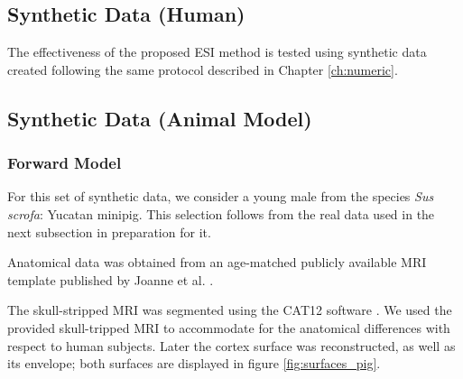 \subsection{Synthetic Data (Human)}

The effectiveness of the proposed ESI method is tested using synthetic data created following the same protocol described in Chapter \ref{ch:numeric}.

\subsection{Synthetic Data (Animal Model)}

%
%

\subsubsection{Forward Model}

For this set of synthetic data, we consider a young male from the species \textit{Sus scrofa}: Yucatan minipig.
%
This selection follows from the real data used in the next subsection in preparation for it.

Anatomical data was obtained from an age-matched publicly available MRI template published by Joanne et al. \cite{pig_template}.

The skull-stripped MRI was segmented using 
the CAT12 software \cite{gaser2022cat}.
%
We used the provided skull-tripped MRI to accommodate for the anatomical differences with respect to human subjects.
%
Later the cortex surface was reconstructed, as well as its envelope; both surfaces are displayed in figure \ref{fig:surfaces_pig}.

